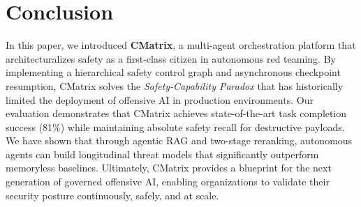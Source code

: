 \section{Conclusion}
\label{sec:conclusion}

In this paper, we introduced \textbf{CMatrix}, a multi-agent orchestration platform that architecturalizes safety as a first-class citizen in autonomous red teaming. By implementing a hierarchical safety control graph and asynchronous checkpoint resumption, CMatrix solves the \textit{Safety-Capability Paradox} that has historically limited the deployment of offensive AI in production environments. Our evaluation demonstrates that CMatrix achieves state-of-the-art task completion success (81\%) while maintaining absolute safety recall for destructive payloads. We have shown that through agentic RAG and two-stage reranking, autonomous agents can build longitudinal threat models that significantly outperform memoryless baselines. Ultimately, CMatrix provides a blueprint for the next generation of governed offensive AI, enabling organizations to validate their security posture continuously, safely, and at scale.
